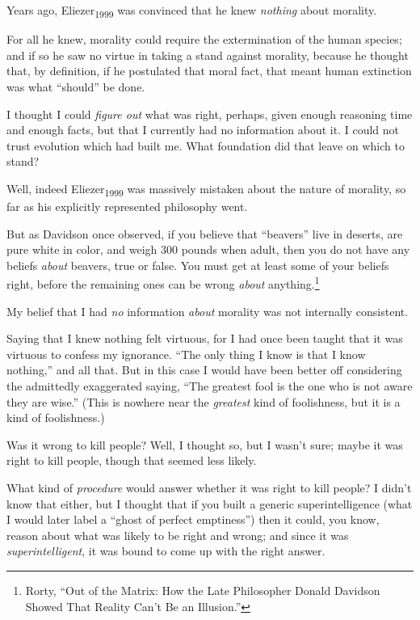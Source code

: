 \myendsectiontext


{
 Years ago, Eliezer\textsubscript{1999} was convinced that he knew
\textit{nothing} about morality. }

{
 For all he knew, morality could require the extermination of the
human species; and if so he saw no virtue in taking a stand against
morality, because he thought that, by definition, if he postulated that
moral fact, that meant human extinction was what
``should'' be done.}

{
 I thought I could \textit{figure out} what was right, perhaps,
given enough reasoning time and enough facts, but that I currently had
no information about it. I could not trust evolution which had built
me. What foundation did that leave on which to stand?}

{
 Well, indeed Eliezer\textsubscript{1999} was massively mistaken
about the nature of morality, so far as his explicitly represented
philosophy went.}

{
 But as Davidson once observed, if you believe that
``beavers'' live in deserts, are
pure white in color, and weigh 300 pounds when adult, then you do not
have any beliefs \textit{about} beavers, true or false. You must get at
least some of your beliefs right, before the remaining ones can be
wrong \textit{about} anything.\footnote{Rorty, ``Out of the Matrix: How the Late
Philosopher Donald Davidson Showed That Reality Can't
Be an Illusion.''}}

{
 My belief that I had \textit{no} information \textit{about}
morality was not internally consistent.}

{
 Saying that I knew nothing felt virtuous, for I had once been
taught that it was virtuous to confess my ignorance.
``The only thing I know is that I know
nothing,'' and all that. But in this case I would
have been better off considering the admittedly exaggerated saying,
``The greatest fool is the one who is not aware they
are wise.'' (This is nowhere near the
\textit{greatest} kind of foolishness, but it is a kind of
foolishness.)}

{
 Was it wrong to kill people? Well, I thought so, but I
wasn't sure; maybe it was right to kill people, though
that seemed less likely.}

{
 What kind of \textit{procedure} would answer whether it was right
to kill people? I didn't know that either, but I
thought that if you built a generic superintelligence (what I would
later label a ``ghost of perfect
emptiness'') then it could, you know, reason about
what was likely to be right and wrong; and since it was
\textit{superintelligent}, it was bound to come up with the right
answer.}

